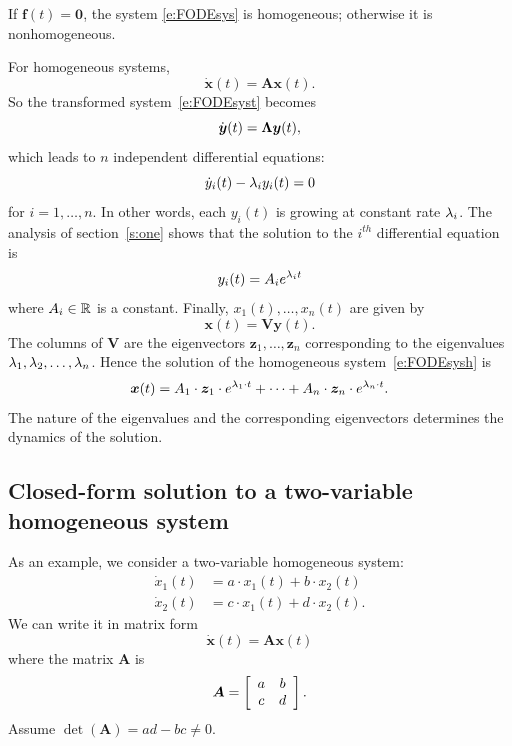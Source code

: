 \documentclass[letterpaper, 11pt, leqno]{article}
\begin{document}
If $\bm{f}(t) =\bm{0}$, the system \eqref{e:FODEsys} is homogeneous; otherwise it is nonhomogeneous. 

For homogeneous systems, 
\begin{equation}
\dot{\bm{x}}(t) =\bm{A} \bm{x}(t).\label{e:FODEsysh}
\end{equation}
So the transformed system~\eqref{e:FODEsyst} becomes 
\begin{equation*}
\dot{\bm{y}}(t) =\bm{\Lambda}\bm{y}(t) ,
\end{equation*}
which leads to $n$ independent differential equations:
\begin{equation*}
\dot{y}_{i}(t) -\lambda_{i} y_{i}(t)=0
\end{equation*}
for $i=1,\dots,n$. In other words, each $y_{i}(t) $ is growing at constant rate $\lambda_{i}$. The analysis of section~\ref{s:one} shows that the solution to the $i^{th}$ differential equation is 
\begin{equation*}
y_{i}(t) =A_{i} e^{\lambda_{i}t}
\end{equation*}
where $A_{i}\in \mathbb{R}$ is a constant. Finally, $x_{1}(t),\dots,x_{n}(t)$ are given by
\begin{equation*}
\bm{x}(t) =\bm{V} \bm{y}(t) .
\end{equation*}
The columns of $\bm{V}$ are the eigenvectors $\bm{z}_{1},\dots,\bm{z}_{n}$ corresponding to the
eigenvalues $\lambda_{1}, \lambda_2, \dots, \lambda_{n}$. Hence the solution of the homogeneous system~\eqref{e:FODEsysh} is 
\begin{equation}
\bm{x}(t) =A_{1}\cdot \bm{z}_{1} \cdot e^{\lambda_{1}\cdot t}+\dots+A_{n}\cdot \bm{z}_{n}\cdot e^{\lambda_{n}\cdot t}.\label{e:SOLEV}
\end{equation}
The nature of the eigenvalues and the corresponding eigenvectors determines
the dynamics of the solution. 

\subsection{Closed-form solution to a two-variable homogeneous system}

As an example, we consider a two-variable homogeneous system:
\begin{align*}
\dot{x}_{1}(t) &=a\cdot x_{1}(t)+b\cdot x_{2}(t) \\
\dot{x}_{2}(t) &=c\cdot x_{1}(t)+d\cdot x_{2}(t).
\end{align*}
We can write it in matrix form
\begin{equation*}
\dot{\bm{x}}(t) =\bm{A} \bm{x}(t)
\end{equation*}
where the matrix $\bm{A}$ is 
\begin{equation*}
\bm{A} =\left[ 
\begin{array}{cc}
a & b \\ 
c & d
\end{array} \right].
\end{equation*}
Assume $\det(\bm{A}) =a d-b c\neq 0. $
\end{document}
